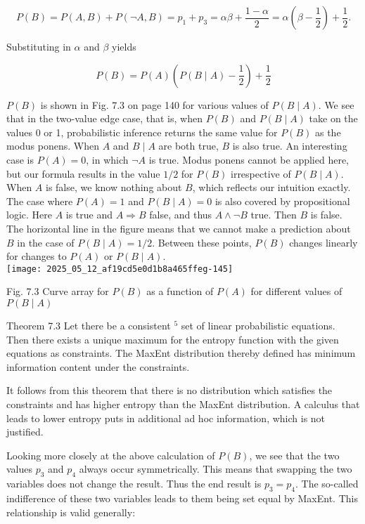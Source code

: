 \documentclass[10pt]{article}
\begin{document}
$$
P(B)=P(A, B)+P(\neg A, B)=p_{1}+p_{3}=\alpha \beta+\frac{1-\alpha}{2}=\alpha\left(\beta-\frac{1}{2}\right)+\frac{1}{2} .
$$

Substituting in $\alpha$ and $\beta$ yields

$$
P(B)=P(A)\left(P(B \mid A)-\frac{1}{2}\right)+\frac{1}{2}
$$

$P(B)$ is shown in Fig. 7.3 on page 140 for various values of $P(B \mid A)$. We see that in the two-value edge case, that is, when $P(B)$ and $P(B \mid A)$ take on the values 0 or 1, probabilistic inference returns the same value for $P(B)$ as the modus ponens. When $A$ and $B \mid A$ are both true, $B$ is also true. An interesting case is $P(A)=0$, in which $\neg A$ is true. Modus ponens cannot be applied here, but our formula results in the value $1 / 2$ for $P(B)$ irrespective of $P(B \mid A)$. When $A$ is false, we know nothing about $B$, which reflects our intuition exactly. The case where $P(A)=1$ and $P(B \mid A)=0$ is also covered by propositional logic. Here $A$ is true and $A \Rightarrow B$ false, and thus $A \wedge \neg B$ true. Then $B$ is false. The horizontal line in the figure means that we cannot make a prediction about $B$ in the case of $P(B \mid A)=1 / 2$. Between these points, $P(B)$ changes linearly for changes to $P(A)$ or $P(B \mid A)$.\\
\texttt{[image: 2025\_05\_12\_af19cd5e0d1b8a465ffeg-145]}

Fig. 7.3 Curve array for $P(B)$ as a function of $P(A)$ for different values of $P(B \mid A)$

Theorem 7.3 Let there be a consistent ${ }^{5}$ set of linear probabilistic equations. Then there exists a unique maximum for the entropy function with the given equations as constraints. The MaxEnt distribution thereby defined has minimum information content under the constraints.

It follows from this theorem that there is no distribution which satisfies the constraints and has higher entropy than the MaxEnt distribution. A calculus that leads to lower entropy puts in additional ad hoc information, which is not justified.

Looking more closely at the above calculation of $P(B)$, we see that the two values $p_{3}$ and $p_{4}$ always occur symmetrically. This means that swapping the two variables does not change the result. Thus the end result is $p_{3}=p_{4}$. The so-called indifference of these two variables leads to them being set equal by MaxEnt. This relationship is valid generally:
\end{document}
